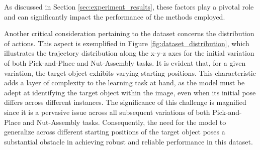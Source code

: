 As discussed in Section \ref{sec:experiment_results}, these factors play a pivotal role and can significantly impact the performance of the methods employed.

Another critical consideration pertaining to the dataset concerns the distribution of actions. This aspect is exemplified in Figure \ref{fig:dataset_distribution}, which illustrates the trajectory distribution along the x-y-z axes for the initial variation of both Pick-and-Place and Nut-Assembly tasks. It is evident that, for a given variation, the target object exhibits varying starting positions. This characteristic adds a layer of complexity to the learning task at hand, as the model must be adept at identifying the target object within the image, even when its initial pose differs across different instances. The significance of this challenge is magnified since it is a pervasive issue across all subsequent variations of both Pick-and-Place and Nut-Assembly tasks. Consequently, the need for the model to generalize across different starting positions of the target object poses a substantial obstacle in achieving robust and reliable performance in this dataset.

